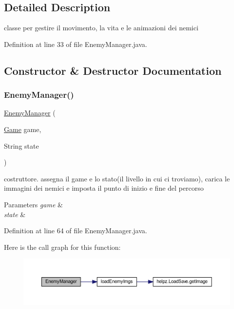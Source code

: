 \subsection{Detailed Description}
classe per gestire il movimento, la vita e le animazioni dei nemici 

Definition at line 33 of file Enemy\+Manager.\+java.



\subsection{Constructor \& Destructor Documentation}
\mbox{\label{classmanagers_1_1_enemy_manager_ab48b3c6b84a71fc0278ad44f818701c6}} 
\subsubsection{\texorpdfstring{Enemy\+Manager()}{EnemyManager()}}
{\footnotesize\ttfamily \hyperlink{classmanagers_1_1_enemy_manager}{Enemy\+Manager} (\begin{DoxyParamCaption}\item[{\hyperlink{classprogetto_1_1_game}{Game}}]{game,  }\item[{String}]{state }\end{DoxyParamCaption})}



costruttore. assegna il game e lo stato(il livello in cui ci troviamo), carica le immagini dei nemici e imposta il punto di inizio e fine del percorso 


\begin{DoxyParams}{Parameters}
{\em game} & \\
\hline
{\em state} & \\
\hline
\end{DoxyParams}


Definition at line 64 of file Enemy\+Manager.\+java.

Here is the call graph for this function\+:\nopagebreak
\begin{figure}[H]
\begin{center}
\leavevmode
\includegraphics[width=350pt]{classmanagers_1_1_enemy_manager_ab48b3c6b84a71fc0278ad44f818701c6_cgraph}
\end{center}
\end{figure}



